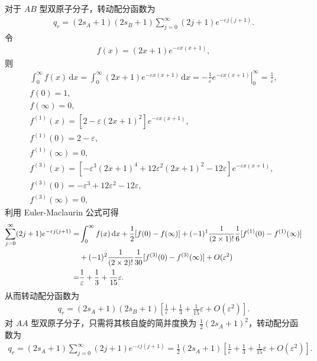 \documentclass{assignment}
\begin{document}
\begin{pf}
    对于 $AB$ 型双原子分子，转动配分函数为
    \begin{align}
        q_r=(2s_A+1)(2s_B+1)\sum_{j=0}^{\infty}(2j+1)e^{-\varepsilon j(j+1)}.
    \end{align}
    令
    \begin{align}
        f(x)=(2x+1)e^{-\varepsilon x(x+1)},
    \end{align}
    则
    \begin{gather}
        \int_0^{\infty}f(x)\,\mathrm{d}x=\int_0^{\infty}(2x+1)e^{-\varepsilon x(x+1)}\,\mathrm{d}x=\left.-\frac{1}{\varepsilon}e^{-\varepsilon x(x+1)}\right\rvert_0^{\infty}=\frac{1}{\varepsilon},\\
        f(0)=1,\\
        f(\infty)=0,\\
        f^{(1)}(x)=[2-\varepsilon(2x+1)^2]e^{-\varepsilon x(x+1)},\\
        f^{(1)}(0)=2-\varepsilon,\\
        f^{(1)}(\infty)=0,\\
        f^{(3)}(x)=[-\varepsilon^3(2x+1)^4+12\varepsilon^2(2x+1)^2-12\varepsilon]e^{-\varepsilon x(x+1)},\\
        f^{(3)}(0)=-\varepsilon^3+12\varepsilon^2-12\varepsilon,\\
        f^{(3)}(\infty)=0,
    \end{gather}
    利用 Euler-Maclaurin 公式可得
    \begin{align}
        \notag\sum_{j=0}^{\infty}(2j+1)e^{-\varepsilon j(j+1)}=&\int_0^{\infty}f(x)\,\mathrm{d}x+\frac{1}{2}[f(0)-f(\infty)]+(-1)^1\frac{1}{(2\times 1)!}\frac{1}{6}[f^{(1)}(0)-f^{(1)}(\infty)]\\
        \notag&+(-1)^2\frac{1}{(2\times 2)!}\frac{1}{30}[f^{(3)}(0)-f^{(3)}(\infty)]+O(\varepsilon^2)\\
        =&\frac{1}{\varepsilon}+\frac{1}{3}+\frac{1}{15}\varepsilon.
    \end{align}
    从而转动配分函数为
    \begin{align}
        q_r=(2s_A+1)(2s_B+1)\left[\frac{1}{\varepsilon}+\frac{1}{3}+\frac{1}{15}\varepsilon+O(\varepsilon^2)\right].
    \end{align}
    对 $AA$ 型双原子分子，只需将其核自旋的简并度换为 $\frac{1}{2}(2s_A+1)^2$，转动配分函数为
    \begin{align}
        q_r=(2s_A+1)\sum_{j=0}^{\infty}(2j+1)e^{-\varepsilon j(j+1)}=\frac{1}{2}(2s_A+1)\left[\frac{1}{\varepsilon}+\frac{1}{3}+\frac{1}{15}\varepsilon+O(\varepsilon^2)\right].

\end{align}
\end{pf}
\end{document}
